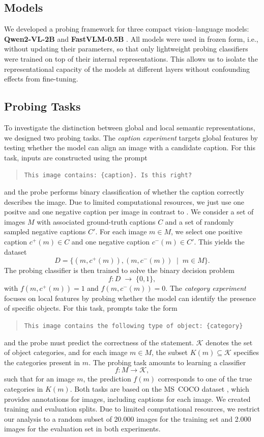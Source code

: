 \documentclass[11pt]{article}
\begin{document}
\subsection{Models}
We developed a probing framework for three compact vision--language models:
\textbf{Qwen2-VL-2B} \cite{qwen2vl2024} and \textbf{FastVLM-0.5B} \cite{fastvlm2025}.
All models were used in frozen form, i.e., without updating their parameters,
so that only lightweight probing classifiers were trained on top of their internal
representations. This allows us to isolate the representational capacity of the models
at different layers without confounding effects from fine-tuning.

\subsection{Probing Tasks}
To investigate the distinction between global and local semantic representations,
we designed two probing tasks. The \emph{caption experiment} targets global features
by testing whether the model can align an image with a candidate caption.
For this task, inputs are constructed using the prompt
\begin{quote}
\texttt{This image contains: \{caption\}. Is this right?}
\end{quote}
and the probe performs binary classification of whether the caption correctly describes the image. Due to limited computational resources, we just use one positve and one negative caption per image in contrast to \cite{tao2024probingmultimodallargelanguage}.
We consider a set of images $M$ with associated ground-truth captions $C$
and a set of randomly sampled negative captions $C'$.
For each image $m \in M$, we select one positive caption $c^+(m) \in C$
and one negative caption $c^-(m) \in C'$.
This yields the dataset
\[
D = \{(m, c^+(m)), (m, c^-(m)) \;\mid\; m \in M\}.
\]
The probing classifier is then trained to solve the binary decision problem
\[
f : D \;\rightarrow\; \{0,1\},
\]
with $f(m, c^+(m)) = 1$ and $f(m, c^-(m)) = 0$.
The \emph{category experiment} focuses on local features by probing whether the model
can identify the presence of specific objects. For this task, prompts take the form
\begin{quote}
\texttt{This image contains the following type of object: \{category\}}
\end{quote}
and the probe must predict the correctness of the statement. $\mathcal{K}$ denotes the set of object categories, and for each image $m \in M$,
the subset $K(m) \subseteq \mathcal{K}$ specifies the categories present in $m$.
The probing task amounts to learning a classifier
\[
f : M \rightarrow \mathcal{K},
\]
such that for an image $m$, the prediction $f(m)$ corresponds to one of the
true categories in $K(m)$.
Both tasks are based on the MS~COCO dataset \cite{lin2014microsoft}, which provides annotations
for images, including captions for each image. We created
training and evaluation splits. Due to limited computational resources, we restrict our analysis to a random subset of 20.000 images for the training set and 2.000 images for the evaluation set in both experiments.
\end{document}
